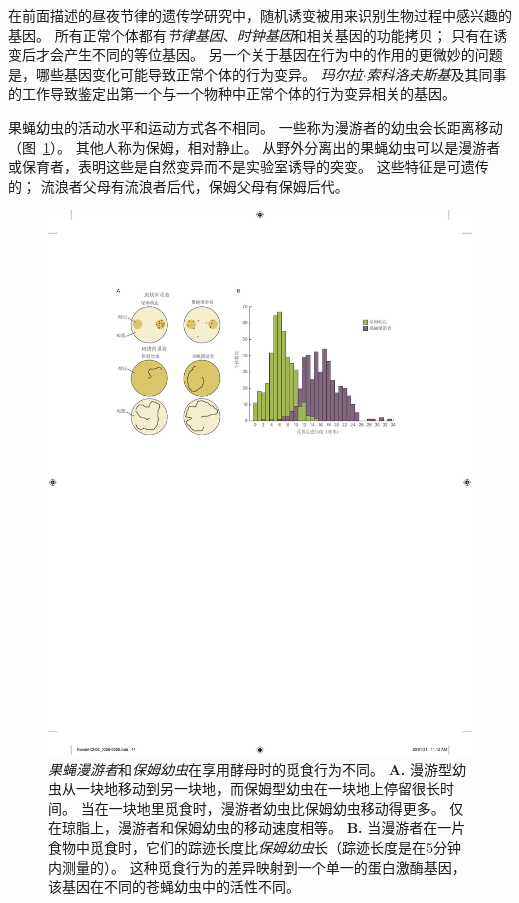 在前面描述的昼夜节律的遗传学研究中，随机诱变被用来识别生物过程中感兴趣的基因。
所有正常个体都有\textit{节律基因}、\textit{时钟基因}和相关基因的功能拷贝；
只有在诱变后才会产生不同的等位基因。
另一个关于基因在行为中的作用的更微妙的问题是，哪些基因变化可能导致正常个体的行为变异。
\textit{玛尔拉$\cdot$索科洛夫斯基}及其同事的工作导致鉴定出第一个与一个物种中正常个体的行为变异相关的基因。


果蝇幼虫的活动水平和运动方式各不相同。
一些称为漫游者的幼虫会长距离移动（图~\ref{fig:2_14}）。
其他人称为保姆，相对静止。
从野外分离出的果蝇幼虫可以是漫游者或保育者，表明这些是自然变异而不是实验室诱导的突变。
这些特征是可遗传的；
流浪者父母有流浪者后代，保姆父母有保姆后代。


\begin{figure}[htbp]
	\centering
	\includegraphics[width=0.95\linewidth]{chap02/fig_2_14}
	\caption{\textit{果蝇漫游者}和\textit{保姆幼虫}在享用酵母时的觅食行为不同\cite{sokolowski2001drosophila}。
		\textbf{A.} 漫游型幼虫从一块地移动到另一块地，而保姆型幼虫在一块地上停留很长时间。
		当在一块地里觅食时，漫游者幼虫比保姆幼虫移动得更多。
		仅在琼脂上，漫游者和保姆幼虫的移动速度相等。
		\textbf{B.} 当漫游者在一片食物中觅食时，它们的踪迹长度比\textit{保姆幼虫}长（踪迹长度是在5分钟内测量的）。
		这种觅食行为的差异映射到一个单一的蛋白激酶基因，该基因在不同的苍蝇幼虫中的活性不同。}
	\label{fig:2_14}
\end{figure}


